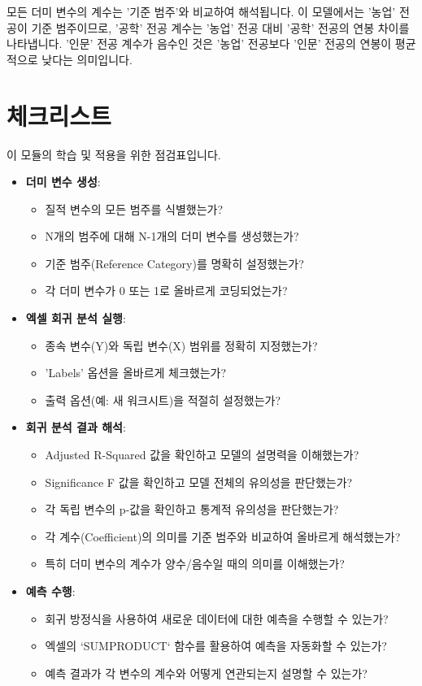 \documentclass[11pt,a4paper]{article}
\begin{document}
\begin{tcolorbox}[warning={중요: 기준 범주와의 비교}]
모든 더미 변수의 계수는 '기준 범주'와 비교하여 해석됩니다. 이 모델에서는 '농업' 전공이 기준 범주이므로, '공학' 전공 계수는 '농업' 전공 대비 '공학' 전공의 연봉 차이를 나타냅니다. '인문' 전공 계수가 음수인 것은 '농업' 전공보다 '인문' 전공의 연봉이 평균적으로 낮다는 의미입니다.
\end{tcolorbox}

\newpage
\section*{체크리스트}

이 모듈의 학습 및 적용을 위한 점검표입니다.

\begin{itemize}
    \item \textbf{더미 변수 생성}:
    \begin{itemize}
        \item 질적 변수의 모든 범주를 식별했는가?
        \item N개의 범주에 대해 N-1개의 더미 변수를 생성했는가?
        \item 기준 범주(Reference Category)를 명확히 설정했는가?
        \item 각 더미 변수가 0 또는 1로 올바르게 코딩되었는가?
    \end{itemize}
    \item \textbf{엑셀 회귀 분석 실행}:
    \begin{itemize}
        \item 종속 변수(Y)와 독립 변수(X) 범위를 정확히 지정했는가?
        \item 'Labels' 옵션을 올바르게 체크했는가?
        \item 출력 옵션(예: 새 워크시트)을 적절히 설정했는가?
    \end{itemize}
    \item \textbf{회귀 분석 결과 해석}:
    \begin{itemize}
        \item Adjusted R-Squared 값을 확인하고 모델의 설명력을 이해했는가?
        \item Significance F 값을 확인하고 모델 전체의 유의성을 판단했는가?
        \item 각 독립 변수의 p-값을 확인하고 통계적 유의성을 판단했는가?
        \item 각 계수(Coefficient)의 의미를 기준 범주와 비교하여 올바르게 해석했는가?
        \item 특히 더미 변수의 계수가 양수/음수일 때의 의미를 이해했는가?
    \end{itemize}
    \item \textbf{예측 수행}:
    \begin{itemize}
        \item 회귀 방정식을 사용하여 새로운 데이터에 대한 예측을 수행할 수 있는가?
        \item 엑셀의 `SUMPRODUCT` 함수를 활용하여 예측을 자동화할 수 있는가?
        \item 예측 결과가 각 변수의 계수와 어떻게 연관되는지 설명할 수 있는가?
    \end{itemize}
\end{itemize}
\end{document}
